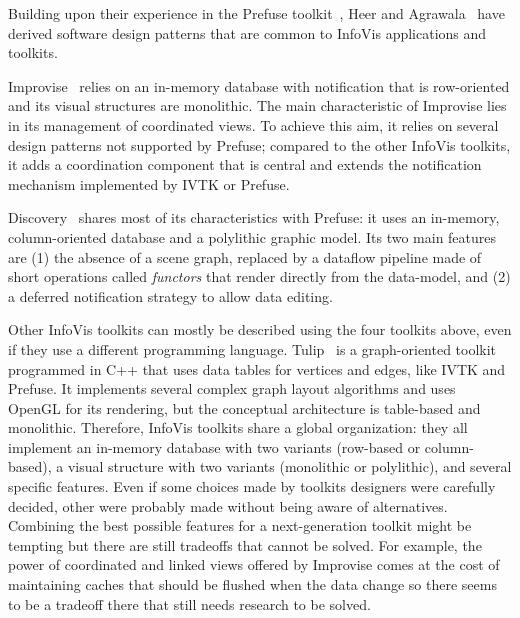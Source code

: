 Building upon their experience in the Prefuse toolkit~\cite{Prefuse},
Heer and Agrawala~\cite{DesignPatternsIV} have derived software design
patterns that are common to InfoVis applications and
toolkits. 

Improvise~\cite{Improvise} relies on an in-memory database with
notification that is row-oriented and its visual structures are
monolithic.  The main characteristic of Improvise lies in its
management of coordinated views.  To achieve this aim, it relies on several
design patterns not supported by Prefuse; compared to the other
InfoVis toolkits, it adds a coordination component
that is central and extends the notification mechanism implemented
by IVTK or Prefuse.

Discovery~\cite{Discovery2,Discovery1,Discovery3} shares most of its
characteristics with Prefuse: it uses an in-memory, column-oriented
database and a polylithic graphic model. Its two main features are (1)
the absence of a scene graph, replaced by a dataflow pipeline made of
short operations called \emph{functors} that render directly from the
data-model, and (2) a deferred notification strategy to allow data
editing.


Other InfoVis toolkits can mostly be described using the four toolkits
above, even if they use a different programming language.
Tulip~\cite{Tulip} is a graph-oriented toolkit programmed in C++ that
uses data tables for vertices and edges, like IVTK and Prefuse.  It
implements several complex graph layout algorithms and uses OpenGL for
its rendering, but the conceptual architecture is table-based and
monolithic.  Therefore, InfoVis toolkits share a
global organization: they all implement an in-memory database with two
variants (row-based or column-based), a visual structure with two
variants (monolithic or polylithic), and several specific features.
Even if some choices made by toolkits designers were carefully
decided, other were probably made without being aware of alternatives.
Combining the best possible features for a next-generation toolkit
might be tempting but there are still tradeoffs that cannot be solved.
For example, the power of coordinated and linked views offered by
Improvise comes at the cost of maintaining caches that should be
flushed when the data change so there seems to be a tradeoff there
that still needs research to be solved.

